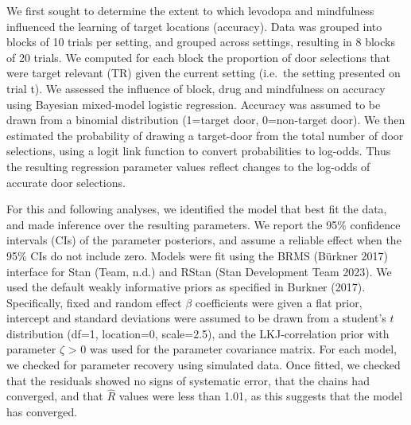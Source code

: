 \documentclass{article}
\begin{document}
We first sought to determine the extent to which levodopa and
mindfulness influenced the learning of target locations (accuracy). Data
was grouped into blocks of 10 trials per setting, and grouped across
settings, resulting in 8 blocks of 20 trials. We computed for each block
the proportion of door selections that were target relevant (TR) given
the current setting (i.e.~the setting presented on trial t). We assessed
the influence of block, drug and mindfulness on accuracy using Bayesian
mixed-model logistic regression. Accuracy was assumed to be drawn from a
binomial distribution (1=target door, 0=non-target door). We then
estimated the probability of drawing a target-door from the total number
of door selections, using a logit link function to convert probabilities
to log-odds. Thus the resulting regression parameter values reflect
changes to the log-odds of accurate door selections.

For this and following analyses, we identified the model that best fit
the data, and made inference over the resulting parameters. We report
the 95\% confidence intervals (CIs) of the parameter posteriors, and
assume a reliable effect when the 95\% CIs do not include zero. Models
were fit using the BRMS (Bürkner 2017) interface for Stan (Team, n.d.)
and RStan (Stan Development Team 2023). We used the default weakly
informative priors as specified in Burkner (2017). Specifically, fixed
and random effect \(\beta\) coefficients were given a flat prior,
intercept and standard deviations were assumed to be drawn from a
student's \(t\) distribution (df=1, location=0, scale=2.5), and the
LKJ-correlation prior with parameter \(\zeta\) \textgreater{} 0 was used
for the parameter covariance matrix. For each model, we checked for
parameter recovery using simulated data. Once fitted, we checked that
the residuals showed no signs of systematic error, that the chains had
converged, and that \(\hat{R}\) values were less than 1.01, as this
suggests that the model has converged.
\end{document}
